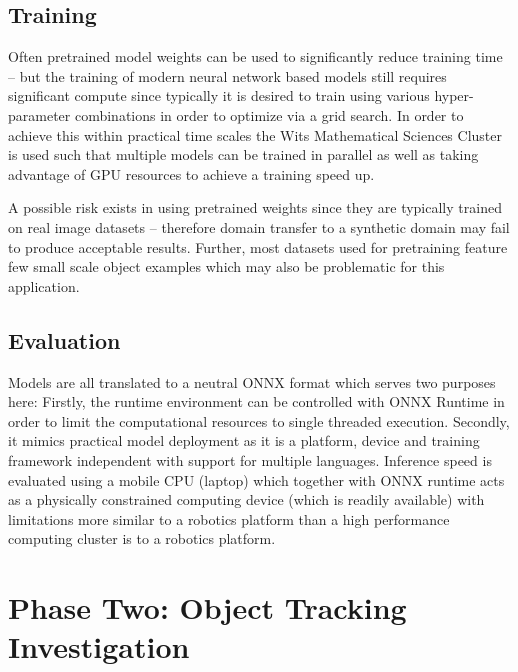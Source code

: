\documentclass[a4paper,twoside,12pt]{report}
\begin{document}
\subsection{Training}

Often pretrained model weights can be used to significantly reduce training time -- but the training of modern neural network based models still requires significant compute since typically it is desired to train using various hyper-parameter combinations in order to optimize via a grid search. In order to achieve this within practical time scales the Wits Mathematical Sciences Cluster is used such that multiple models can be trained in parallel as well as taking advantage of GPU resources to achieve a training speed up.  

A possible risk exists in using pretrained weights since they are typically trained on real image datasets -- therefore domain transfer to a synthetic domain may fail to produce acceptable results. Further, most datasets used for pretraining feature few small scale object examples which may also be problematic for this application.

\subsection{Evaluation}

Models are all translated to a neutral ONNX format which serves two purposes here: Firstly, the runtime environment can be controlled with ONNX Runtime in order to limit the computational resources to single threaded execution. Secondly, it mimics practical model deployment as it is a platform, device and training framework independent with support for multiple languages. Inference speed is evaluated using a mobile CPU (laptop) which together with ONNX runtime acts as a physically constrained computing device (which is readily available) with limitations more similar to a robotics platform than a high performance computing cluster is to a robotics platform.


\section{Phase Two: Object Tracking Investigation}
\end{document}
